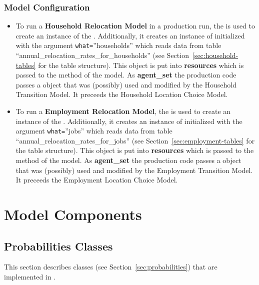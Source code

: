 \subsubsection{Model Configuration}
%
\begin{itemize}
\item To run a {\bf Household Relocation Model}\label{page:HRM}
  in a production run, the
   is used to create an instance of the
  . Additionally, it creates an instance of
   initialized with the argument \verb|what=|''households''
  which reads data from table ``annual_relocation_rates_for_households'' (see
  Section~\ref{sec:household-tables} for the table structure). This object is
  put into {\bf resources} which is passed to the  method of
  the model. As {\bf agent_set} the production code passes a
   object that was (possibly) used and modified by the
  Household Transition Model. It preceeds 
  the Household Location Choice Model.
\item To run a {\bf Employment Relocation Model},\label{page:ERM}
   the
   is used to create an instance of the
  . Additionally, it creates an instance of
   initialized with the argument \verb|what=|''jobs''
  which reads data from table ``annual_relocation_rates_for_jobs'' (see
  Section~\ref{sec:employment-tables} for the table structure). This object is
  put into {\bf resources} which is passed to the  method of
  the model. As {\bf agent_set} the production code passes a
   object that was (possibly) used and modified by the
  Employment Transition Model.
  It preceeds 
  the Employment Location Choice Model.
\end{itemize}

%
\section{Model Components}
%
\label{sec:urbansim-model-components}
%
\subsection{Probabilities Classes}
%
\label{sec:urbansim-probabilities}
This section describes  classes (see
Section~\ref{sec:probabilities}) that are implemented in .

